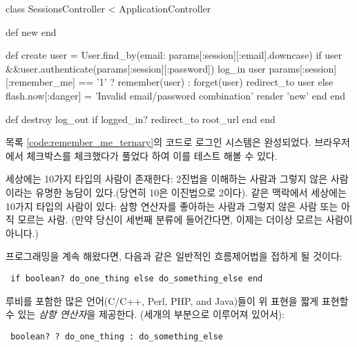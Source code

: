 {{\newpage

\begin{codelisting} \label{code:remember_me_ternary}  

\begin{code} class SessionsController < ApplicationController 

def new end 

def create user = User.find_by(email: params[:session][:email].downcase) if user &&user.authenticate(params[:session][:password]) log_in user params[:session][:remember_me] == '1' ? remember(user) : forget(user) redirect_to user else flash.now[:danger] = 'Invalid email/password combination' render 'new' end end 

def destroy log_out if logged_in? redirect_to root_url end end \end{code} \end{codelisting} 

\noindent 목록 \ref{code:remember_me_ternary}의 코드로 로그인 시스템은 완성되었다. 브라우저에서 체크박스를 체크했다가 풀었다 하여 이를 테스트 해볼 수 있다. 

\begin{aside} \label{aside:ternary_operator}  

세상에는 10가지 타입의 사람이 존재한다: 2진법을 이해하는 사람과 그렇지 않은 사람 이라는 유명한 농담이 있다.(당연히 10은 이진법으로 2이다). 같은 맥락에서 세상에는 10가지 타입의 사람이 있다: 삼항 연산자를 좋아하는 사람과 그렇지 않은 사람 또는 아직 모르는 사람. (만약 당신이 세번째 분류에 들어간다면, 이제는 더이상 모르는 사람이 아니다.) 

프로그래밍을 계속 해왔다면, 다음과 같은 일반적인 흐름제어법을 접하게 될 것이다: 

\begin{verbatim} if boolean? do_one_thing else do_something_else end \end{verbatim} 

\noindent 루비를 포함한 많은 언어(C/C++, Perl, PHP, and Java)들이 위 표현을 짧게 표현할 수 있는 \emph{삼항 연산자}을 제공한다. (세개의 부분으로 이루어져 있어서): 

\begin{verbatim} boolean? ? do_one_thing : do_something_else \end{verbatim} 


\end{aside}}}
